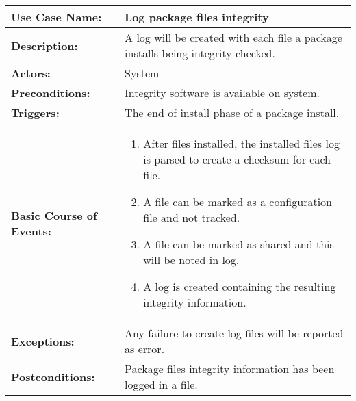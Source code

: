 
\begin{tabularx}{\linewidth}{|l|X|}
\hline
\textbf{Use Case Name:} & \textbf{Log package files integrity} \\
\hline
\textbf{Description:} & 
A log will be created with each file a package installs being integrity checked. \\
\hline
\textbf{Actors:} & System \\
\hline
\textbf{Preconditions:} & Integrity software is available on system. \\
\hline
\textbf{Triggers:} & The end of install phase of a package install. \\
\hline
\textbf{Basic Course of Events:} & 
\begin{minipage}{\linewidth} 
  \vspace{0.05em}
  \begin{enumerate}
    \item After files installed, the installed files log is parsed to create a checksum for each file.
    \item A file can be marked as a configuration file and not tracked.
    \item A file can be marked as shared and this will be noted in log.
    \item A log is created containing the resulting integrity information.
  \end{enumerate}
  \vspace{0.05em}
\end{minipage}
\\
\hline
\textbf{Exceptions:} & 
Any failure to create log files will be reported as error. \\
\hline 
\textbf{Postconditions:} &
Package files integrity information has been logged in a file. \\
\hline
\end{tabularx}


